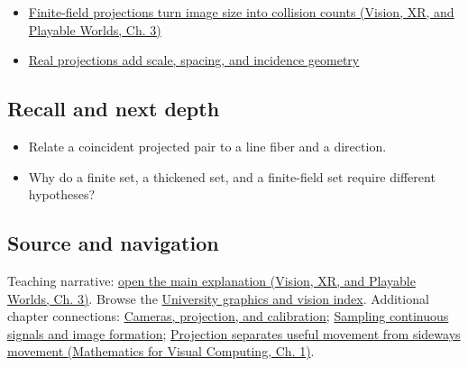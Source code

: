 \begin{itemize}
\tightlist
\item
  \href{../07-Vision-XR-and-Playable-Worlds/main.pdf\#nameddest=04-visual-computing-ii-ch032-finite-field-projections-turn-image-size-into-collision-counts}{Finite-field projections turn image size into collision counts (Vision, XR, and Playable Worlds, Ch. 3)}
\item
  \hyperref[04-visual-computing-ii-ch033-real-projections-add-scale-spacing-and-incidence-geometry]{Real projections add scale, spacing, and incidence geometry}
\end{itemize}

\subsection{Recall and next depth}\label{appendix-3c73f7862157-recall-and-next-depth}

\begin{itemize}
\tightlist
\item
  Relate a coincident projected pair to a line fiber and a direction.
\item
  Why do a finite set, a thickened set, and a finite-field set require different hypotheses?
\end{itemize}

\subsection{Source and navigation}\label{appendix-3c73f7862157-source-and-navigation}

Teaching narrative: \href{../07-Vision-XR-and-Playable-Worlds/main.pdf\#nameddest=04-visual-computing-ii-ch032-finite-field-projections-turn-image-size-into-collision-counts}{open the main explanation (Vision, XR, and Playable Worlds, Ch. 3)}. Browse the \hyperref[appendix-a6d556a4ef50-university-graphics-vision-and-photography---independent-series]{University graphics and vision index}. Additional chapter connections: \hyperref[03-visual-computing-i-ch003-cameras-projection-and-calibration]{Cameras, projection, and calibration}; \hyperref[03-visual-computing-i-ch003-sampling-continuous-signals-and-image-formation]{Sampling continuous signals and image formation}; \href{../02-Mathematics-for-Visual-Computing/main.pdf\#nameddest=01-foundations-i-ch017-projection-separates-useful-movement-from-sideways-movement}{Projection separates useful movement from sideways movement (Mathematics for Visual Computing, Ch. 1)}.

